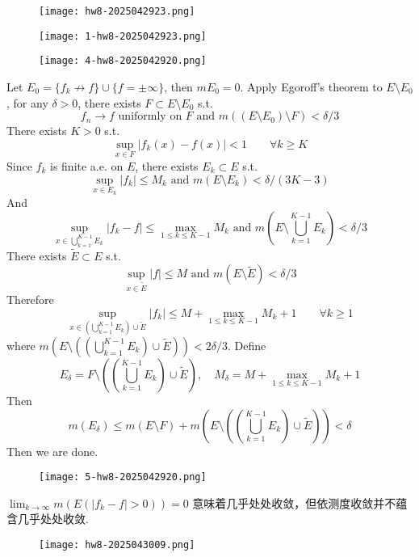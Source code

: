 \begin{figure}[H]
\centering
\texttt{[image: hw8-2025042923.png]}
\label{}
\end{figure}
\begin{figure}[H]
\centering
\texttt{[image: 1-hw8-2025042923.png]}
\label{}
\end{figure}

\begin{exercise}
\begin{figure}[H]
\centering
\texttt{[image: 4-hw8-2025042920.png]}
\label{}
\end{figure}
\end{exercise}
Let $E_0=\{ f_k\not\to f \}\cup \{ f=\pm \infty \}$, then $mE_0=0$. Apply Egoroff's theorem to $E\setminus E_0$, for any $\delta>0$, there exists $F\subset E\setminus E_0$ s.t.
\[
f_n\to f\text{ uniformly on }F\text{ and }m((E\setminus E_0)\setminus F)<\delta/3
\]
There exists $K>0$ s.t.
\[
\sup_{x\in F}\lvert f_k(x)-f(x) \rvert <1\qquad \forall k\geq K
\]
Since $f_k$ is finite a.e. on $E$, there exists $E_k\subset E$ s.t.
\[
\sup_{x\in E_k}\lvert f_k \rvert \leq M_k \text{ and }m(E\setminus E_k)<\delta/(3K-3)
\]
And
\[
\sup_{x\in \bigcup_{k=1}^{K-1}E_k }\lvert f_k-f \rvert \leq \max_{1\leq k\leq K-1}M_k\text{ and }m\left( E\setminus \bigcup_{k=1}^{K-1} E_k \right)<\delta/3
\]
There exists $\widetilde{E}\subset E$ s.t.
\[
\sup_{x\in \widetilde{E}}\lvert f \rvert \leq M\text{ and }m(E\setminus \widetilde{E})<\delta/3
\]
Therefore
\[
\sup_{x\in \left( \bigcup_{k=1}^{K-1} E_k \right)\cup\widetilde{E}}\lvert f_k \rvert \leq M+\max_{1\leq k\leq K-1}M_k+1\qquad \forall k\geq 1
\]
where $m\left( E\setminus \left( \left( \bigcup_{k=1}^{K-1} E_k \right)\cup\widetilde{E} \right) \right)<2\delta/3$. Define
\[
E_{\delta}=F\setminus\left( \left( \bigcup_{k=1}^{K-1} E_k \right)\cup \widetilde{E} \right),\quad M_{\delta}=M+\max_{1\leq k\leq K-1}M_k+1
\]
Then
\[
m(E_{\delta})\leq m(E\setminus F)+m\left( E\setminus \left( \left( \bigcup_{k=1}^{K-1} E_k \right)\cup \widetilde{E} \right) \right)<\delta
\]
Then we are done.

\begin{exercise}
\begin{figure}[H]
\centering
\texttt{[image: 5-hw8-2025042920.png]}
\label{}
\end{figure}
\end{exercise}
$\lim_{ k \to \infty }m(E(\lvert f_k-f \rvert>0))=0$ 意味着几乎处处收敛，但依测度收敛并不蕴含几乎处处收敛.
\begin{figure}[H]
\centering
\texttt{[image: hw8-2025043009.png]}
\label{}
\end{figure}

